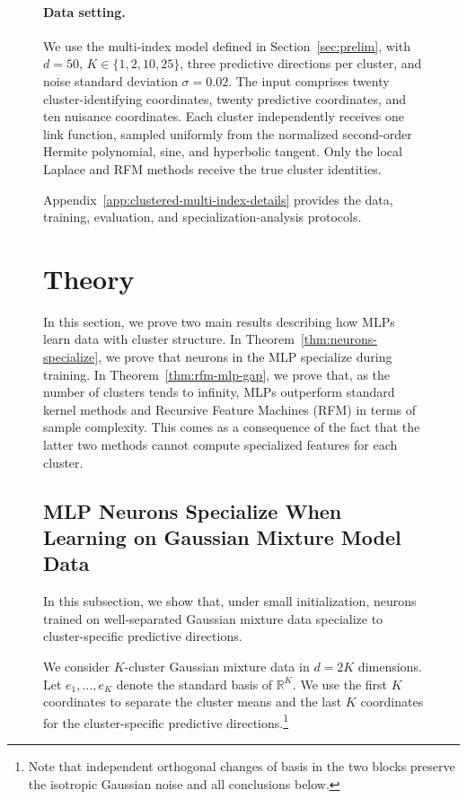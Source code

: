 \documentclass{article}
\newcounter{setting}[section]
\newcounter{model}[section]
\newcounter{initialization}[section]
\begin{document}
\begin{figure}
\paragraph{Data setting.}
We use the multi-index model defined in Section~\ref{sec:prelim}, with
\(d=50\), \(K\in\{1,2,10,25\}\), three predictive directions per cluster,
and noise standard deviation \(\sigma=0.02\). The input comprises twenty
cluster-identifying coordinates, twenty predictive coordinates, and ten
nuisance coordinates.
Each cluster independently receives one link function, sampled uniformly
from the normalized second-order Hermite polynomial, sine, and hyperbolic
tangent.
Only the local Laplace and RFM methods receive the true cluster identities.

Appendix~\ref{app:clustered-multi-index-details} provides the data,
training, evaluation, and specialization-analysis protocols.



\clearpage
\section{Theory}
\label{sec:specialization-theory}

In this section, we prove two main results describing how
MLPs learn data with cluster structure. In
Theorem~\ref{thm:neurons-specialize}, we prove that neurons in the MLP
specialize during training. In Theorem~\ref{thm:rfm-mlp-gap}, we prove that,
as the number of clusters tends to infinity, MLPs outperform standard kernel
methods and Recursive Feature Machines (RFM) in terms of sample complexity. This comes as a consequence of the fact that the latter two methods cannot compute specialized features for each
cluster.

\subsection{MLP Neurons Specialize When Learning on Gaussian Mixture Model Data}
\label{sec:early-specialization}

In this subsection, we show that, under small initialization,
neurons trained on well-separated Gaussian mixture data specialize to
cluster-specific predictive directions.


We consider $K$-cluster Gaussian mixture data in $d=2K$ dimensions. Let
$e_1,\ldots,e_K$ denote the standard basis of $\mathbb R^K$. We use the first
$K$ coordinates to separate the cluster means and the last $K$ coordinates
for the cluster-specific predictive directions.\footnote{Note that independent orthogonal changes of basis in the
two blocks preserve the isotropic Gaussian noise and all conclusions below.}


\end{figure}
\end{document}
